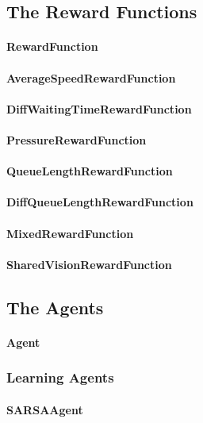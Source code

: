 \subsection{The Reward Functions}

\paragraph{RewardFunction}
\paragraph{AverageSpeedRewardFunction}
\paragraph{DiffWaitingTimeRewardFunction}
\paragraph{PressureRewardFunction}
\paragraph{QueueLengthRewardFunction}
\paragraph{DiffQueueLengthRewardFunction}
\paragraph{MixedRewardFunction}
\paragraph{SharedVisionRewardFunction}

\subsection{The Agents}

\paragraph{Agent}

\subsubsection{Learning Agents}

\paragraph{SARSAAgent}

